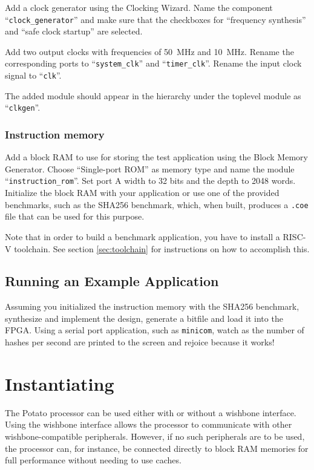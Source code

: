 \documentclass[12pt,a4paper]{report}
\begin{document}
Add a clock generator using the Clocking Wizard. Name the component ``\texttt{clock\_generator}''
and make sure that the checkboxes for ``frequency synthesis'' and ``safe clock startup'' are
selected.

Add two output clocks with frequencies of 50~MHz and 10~MHz. Rename the corresponding ports
to ``\texttt{system\_clk}'' and ``\texttt{timer\_clk}''. Rename the input clock signal to
``\texttt{clk}''.

The added module should appear in the hierarchy under the toplevel module as ``\texttt{clkgen}''.

\subsection{Instruction memory}

Add a block RAM to use for storing the test application using the Block Memory Generator.
Choose ``Single-port ROM'' as memory type and name the module ``\texttt{instruction\_rom}''.
Set port A width to 32 bits and the depth to 2048 words. Initialize the block RAM with
your application or use one of the provided benchmarks, such as the SHA256 benchmark,
which, when built, produces a \texttt{.coe} file that can be used for this purpose.

Note that in order to build a benchmark application, you have to install a RISC-V toolchain.
See section \ref{sec:toolchain} for instructions on how to accomplish this.

\section{Running an Example Application}

Assuming you initialized the instruction memory with the SHA256 benchmark, synthesize and
implement the design, generate a bitfile and load it into the FPGA. Using a serial port
application, such as \texttt{minicom}, watch as the number of hashes per second are
printed to the screen and rejoice because it works!

\chapter{Instantiating}

The Potato processor can be used either with or without a wishbone interface. Using the wishbone
interface allows the processor to communicate with other wishbone-compatible peripherals. However,
if no such peripherals are to be used, the processor can, for instance, be connected directly to
block RAM memories for full performance without needing to use caches.
\end{document}
